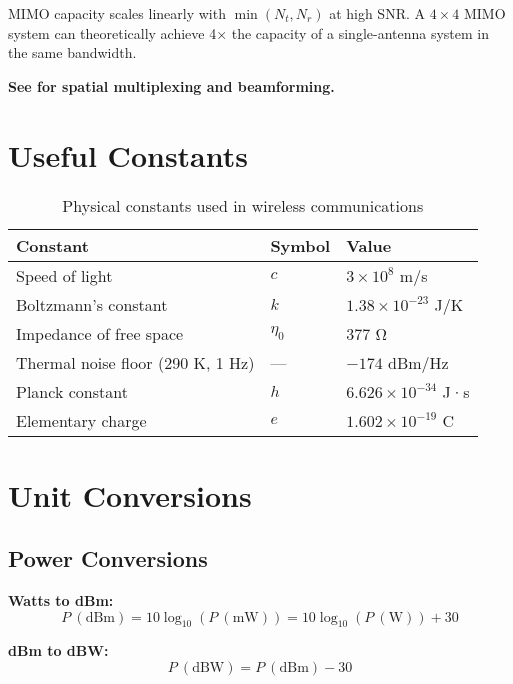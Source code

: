 \begin{keyconcept}
MIMO capacity scales linearly with $\min(N_t, N_r)$ at high SNR. A $4\times4$ MIMO system can theoretically achieve 4× the capacity of a single-antenna system in the same bandwidth.
\end{keyconcept}

\textbf{See  for spatial multiplexing and beamforming.}

\section{Useful Constants}
\label{sec:useful-constants}

\begin{table}[h]
\centering
\begin{tabular}{@{}lll@{}}
\toprule
\textbf{Constant} & \textbf{Symbol} & \textbf{Value} \\
\midrule
Speed of light & $c$ & $3 \times 10^8$ m/s \\
Boltzmann's constant & $k$ & $1.38 \times 10^{-23}$ J/K \\
Impedance of free space & $\eta_0$ & $377$ Ω \\
Thermal noise floor (290 K, 1 Hz) & --- & $-174$ dBm/Hz \\
Planck constant & $h$ & $6.626 \times 10^{-34}$ J·s \\
Elementary charge & $e$ & $1.602 \times 10^{-19}$ C \\
\bottomrule
\end{tabular}
\caption{Physical constants used in wireless communications}
\label{tab:constants}
\end{table}

\section{Unit Conversions}
\label{sec:unit-conversions}

\subsection{Power Conversions}

\textbf{Watts to dBm:}
\begin{equation}
P\ (\text{dBm}) = 10\log_{10}(P\ (\text{mW})) = 10\log_{10}(P\ (\text{W})) + 30
\label{eq:power-dbm}
\end{equation}

\textbf{dBm to dBW:}
\begin{equation}
P\ (\text{dBW}) = P\ (\text{dBm}) - 30
\label{eq:dbm-to-dbw}
\end{equation}

